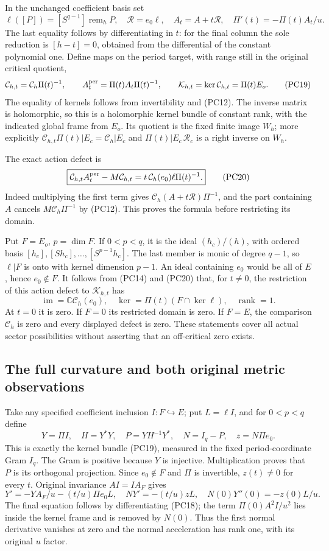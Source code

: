 \documentclass{article}
\begin{document}
In the unchanged coefficient basis set
\[
 \ell([P])=[S^{q-1}]\operatorname{rem}_hP,\quad
 \mathcal R=e_0\ell,\quad A_t=A+t\mathcal R,\quad
 \Pi'(t)=-\Pi(t)A_t/u.
 \tag{PC18}
\]
The last equality follows by differentiating in $t$: for the final
column the sole reduction is $[h-t]=0$, obtained from the
differential of the constant polynomial one.
Define maps on the period target, with range still in the original
critical quotient,
\[
 \mathcal C_{h,t}=\mathcal C_h\Pi(t)^{-1},\qquad
 A_t^{\rm per}=\Pi(t)A_t\Pi(t)^{-1},\qquad
 \mathcal K_{h,t}=\ker\mathcal C_{h,t}=\Pi(t)E_o.
 \tag{PC19}
\]
The equality of kernels follows from invertibility and (PC12).
The inverse matrix is holomorphic, so this is a holomorphic kernel
bundle of constant rank, with the indicated global frame from $E_o$.
Its quotient is the fixed finite image $W_h$; more explicitly
$\mathcal C_{h,t}\Pi(t)|E_c=\mathcal C_h|E_c$ and
$\Pi(t)|E_c\,\mathcal R_c$ is a right inverse on $W_h$.

The exact action defect is
\[
 \boxed{\mathcal C_{h,t}A_t^{\rm per}-M\mathcal C_{h,t}
       =t\,\mathcal C_h(e_0)\ell\Pi(t)^{-1}.}
 \tag{PC20}
\]
Indeed multiplying the first term gives
$\mathcal C_h(A+t\mathcal R)\Pi^{-1}$, and the part containing
$A$ cancels $M\mathcal C_h\Pi^{-1}$ by (PC12).  This proves
the formula before restricting its domain.

Put $F=E_o$, $p=\dim F$.  If $0<p<q$, it is the ideal
$(h_c)/(h)$, with ordered basis
$[h_c],[Sh_c],\ldots,[S^{p-1}h_c]$.
The last member is monic of degree $q-1$, so
$\ell|F$ is onto with kernel dimension $p-1$.
An ideal containing $e_0$ would be all of $E$, hence $e_0\notin F$.
It follows from (PC14) and (PC20) that, for $t\ne0$, the
restriction of this action defect to $\mathcal K_{h,t}$ has
\[
 \operatorname{im}=\mathbb C\mathcal C_h(e_0),\quad
 \ker=\Pi(t)(F\cap\ker\ell),\quad\operatorname{rank}=1.
 \tag{PC21}
\]
At $t=0$ it is zero.  If $F=0$ its restricted domain is zero.
If $F=E$, the comparison $\mathcal C_h$ is zero and every
displayed defect is zero.  These statements cover all actual
sector possibilities without asserting that an off-critical zero exists.

\subsection{The full curvature and both original metric observations}

Take any specified coefficient inclusion $I:F\hookrightarrow E$;
put $L=\ell I$, and for $0<p<q$ define
\[
 Y=\Pi I,\quad H=Y^*Y,\quad
 P=YH^{-1}Y^*,\quad N=I_q-P,\quad z=N\Pi e_0.
 \tag{PC22}
\]
This is exactly the kernel bundle (PC19), measured in the fixed
period-coordinate Gram $I_q$.  The Gram is positive because $Y$
is injective.  Multiplication proves that $P$ is its orthogonal
projection.  Since $e_0\notin F$ and $\Pi$ is invertible,
$z(t)\ne0$ for every $t$.  Original invariance $AI=IA_F$ gives
\[
 Y'=-YA_F/u-(t/u)\Pi e_0L,
 \quad NY'=-(t/u)zL,
 \quad N(0)Y''(0)=-z(0)L/u.
 \tag{PC23}
\]
The final equation follows by differentiating (PC18); the term
$\Pi(0)A^2I/u^2$ lies inside the kernel frame and is removed by
$N(0)$.  Thus the first normal derivative vanishes at zero and
the normal acceleration has rank one, with its original $u$ factor.
\end{document}

